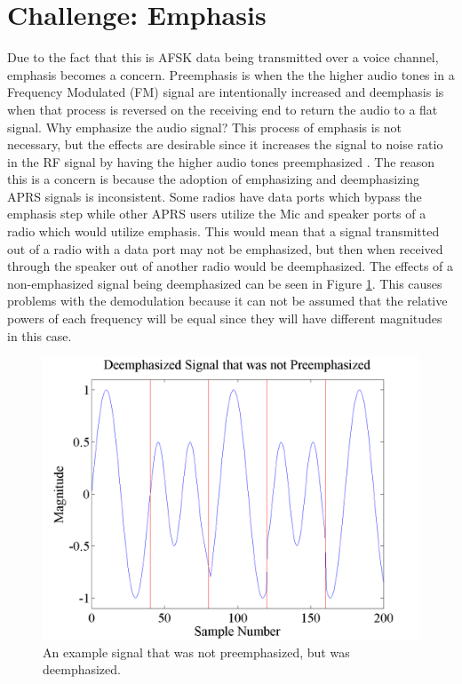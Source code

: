 \section{Challenge: Emphasis}
Due to the fact that this is AFSK data being transmitted over a voice channel, emphasis becomes a concern. Preemphasis is when the the higher audio tones in a Frequency Modulated (FM) signal are intentionally increased and deemphasis is when that process is reversed on the receiving end to return the audio to a flat signal. Why emphasize the audio signal? This process of emphasis is not necessary, but the effects are desirable since it increases the signal to noise ratio in the RF signal by having the higher audio tones preemphasized \cite{Gibilisco1994}. The reason this is a concern is because the adoption of emphasizing and deemphasizing APRS signals is inconsistent. Some radios have data ports which bypass the emphasis step while other APRS users utilize the Mic and speaker ports of a radio which would utilize emphasis. This would mean that a signal transmitted out of a radio with a data port may not be emphasized, but then when received through the speaker out of another radio would be deemphasized. The effects of a non-emphasized signal being deemphasized can be seen in Figure \ref{emphasisExample}. This causes problems with the demodulation because it can not be assumed that the relative powers of each frequency will be equal since they will have different magnitudes in this case. 
\begin{figure}
  \centering
	\includegraphics[width=0.75\linewidth]{images/DeemphasizedSignalthatwasnotPreemphasized.png} 
	\caption{An example signal that was not preemphasized, but was deemphasized.}
   \label{emphasisExample}
\end{figure}
